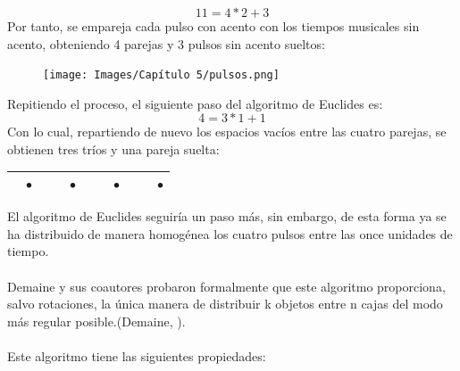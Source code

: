 \documentclass[a4paper, openright, 11pt, titlepage]{report}
\theoremstyle{definition}\newtheorem{defin}[propo]{Definition}
\theoremstyle{definition}\newtheorem{obser}[propo]{Remark}
\theoremstyle{definition}\newtheorem{ejem}[propo]{Ejemplo}
\theoremstyle{definition}\newtheorem{algoritmo}[propo]{Algoritmo}
\begin{document}
$$11 = \boxed{4}*2 + \boxed{3}$$
Por tanto, se empareja cada pulso con acento con los tiempos musicales sin acento, obteniendo 4 parejas y 3 pulsos sin acento sueltos:
\begin{figure}[H]
    \centering
    \texttt{[image: Images/Capítulo 5/pulsos.png]}
\end{figure}
Repitiendo el proceso, el siguiente paso del algoritmo de Euclides es:
$$4 = \boxed{3}*1 + \boxed{1}$$
Con lo cual, repartiendo de nuevo los espacios vacíos entre las cuatro parejas, se obtienen tres tríos y una pareja suelta:
\begin{table}[H]
    \centering
    \begin{tabular}{|c|c|c|c|c|c|c|c|c|c|c|}
    \hline
         & $\bullet$ & & & $\bullet$ & & &$\bullet$ & & &$\bullet$\\
        \hline
    \end{tabular}
\end{table}
El algoritmo de Euclides seguiría un paso más, sin embargo, de esta forma ya se ha distribuido de manera homogénea los cuatro pulsos entre las once unidades de tiempo.\\\\
Demaine y sus coautores probaron formalmente que este algoritmo proporciona, salvo rotaciones, la única manera de distribuir k objetos entre n cajas del modo más regular posible.(Demaine, \cite{demaine}).\\\\
Este algoritmo tiene las siguientes propiedades:
\end{document}
